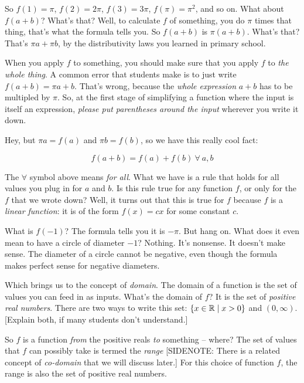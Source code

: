 \documentclass{amsart}
\begin{document}
So $f(1) = \pi$, $f(2) = 2\pi$, $f(3) = 3\pi$, $f(\pi) = \pi^2$, and
so on. What about $f(a + b)$? What's that? Well, to calculate $f$ of
something, you do $\pi$ times that thing, that's what the formula
tells you. So $f(a + b)$ is $\pi(a + b)$. What's that? That's $\pi a +
\pi b$, by the distributivity laws you learned in primary school. 

When you apply $f$ to something, you should make sure that you apply
$f$ to {\em the whole thing}. A common error that students make
is to just write $f(a + b) = \pi a + b$. That's wrong, because the
{\em whole expression} $a + b$ has to be multipled by $\pi$. So, at
the first stage of simplifying a function where the input is itself an
expression, {\em please put parentheses around the input} wherever you
write it down.

Hey, but $\pi a = f(a)$ and $\pi b = f(b)$, so we have this really
cool fact:

\begin{equation*}
  f(a + b) = f(a) + f(b) \ \forall \ a,b
\end{equation*}

The $\forall$ symbol above means {\em for all}. What
we have is a rule that holds for all values you plug in for $a$ and
$b$. Is this rule true for any function $f$, or only for the $f$ that
we wrote down? Well, it turns out that this is true for $f$ because
$f$ is a {\em linear function}: it is of the form $f(x) = cx$ for some
constant $c$.

What is $f(-1)$? The formula tells you it is $-\pi$. But hang
on. What does it even mean to have a circle of diameter $-1$?
Nothing. It's nonsense. It doesn't make sense. The diameter of a
circle cannot be negative, even though the formula makes perfect sense
for negative diameters.

Which brings us to the concept of {\em domain}. The domain of a
function is the set of values you can feed in as inputs. What's the
domain of $f$? It is the set of {\em positive real numbers}. There are
two ways to write this set: $\{ x \in \mathbb{R} \mid x > 0 \}$ and
$(0,\infty)$. [Explain both, if many students don't understand.]

So $f$ is a function {\em from} the positive reals {\em to} something
-- where? The set of values that $f$ can possibly take is termed the
{\em range} [SIDENOTE: There is a related concept of {\em co-domain}
  that we will discuss later.] For this choice of function $f$, the
range is also the set of positive real numbers.
\end{document}
